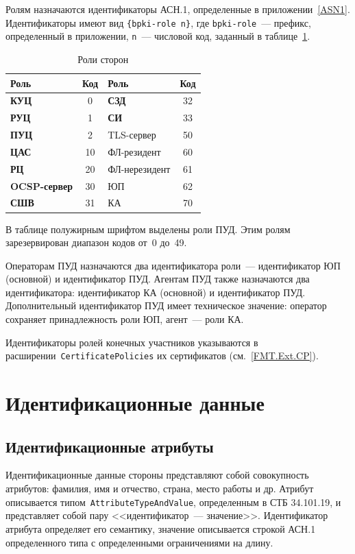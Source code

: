 Ролям назначаются идентификаторы АСН.1, определенные в приложении~\ref{ASN1}. 
Идентификаторы имеют вид \verb|{bpki-role n}|,
где \verb|bpki-role|~--- префикс, определенный в приложении,
\texttt{n}~--- числовой код, заданный в таблице~\ref{Table.ENTITIES.Roles}.

\begin{table}[H]
\caption{Роли сторон}
\label{Table.ENTITIES.Roles}
\begin{tabular}{|l|c||l|c|}
\hline
Роль & Код & Роль & Код\\
\hline
\hline
{\bf КУЦ}        & 0    & {\bf СЗД}      & 32 \\
{\bf РУЦ}        & 1    & {\bf СИ}       & 33 \\
{\bf ПУЦ}        & 2    & TLS-сервер     & 50 \\
{\bf ЦАС}        & 10   & ФЛ-резидент    & 60 \\
{\bf РЦ}         & 20   & ФЛ-нерезидент  & 61 \\
{\bf OCSP-сервер}& 30   & ЮП             & 62 \\
{\bf СШВ}        & 31   & КА             & 70 \\
\hline
\end{tabular}
\end{table}

В таблице полужирным шрифтом выделены роли ПУД.
Этим ролям зарезервирован диапазон кодов от~0 до~49.

Операторам ПУД назначаются два идентификатора роли~---
идентификатор ЮП (основной) и идентификатор ПУД. 
%
Агентам ПУД также назначаются два идентификатора: 
идентификатор КА (основной) и идентификатор ПУД. 
%
Дополнительный идентификатор ПУД имеет техническое значение:
оператор сохраняет принадлежность роли ЮП, агент~--- 
роли КА.

Идентификаторы ролей конечных участников указываются в 
расширении~\texttt{CertificatePolicies} их сертификатов
(см.~\ref{FMT.Ext.CP}).

\section{Идентификационные данные}\label{ENTITIES.Name}

\subsection{Идентификационные атрибуты}\label{ENTITIES.Attrs}

Идентификационные данные стороны представляют собой совокупность атрибутов: 
фамилия, имя и отчество, страна, место работы и др.  
%
Атрибут описывается типом~\texttt{AttributeTypeAndValue}, определенным в 
СТБ 34.101.19, и представляет собой пару <<идентификатор~--- значение>>. 
Идентификатор атрибута определяет его семантику, 
значение описывается строкой АСН.1 определенного типа с определенными 
ограничениями на длину.  

